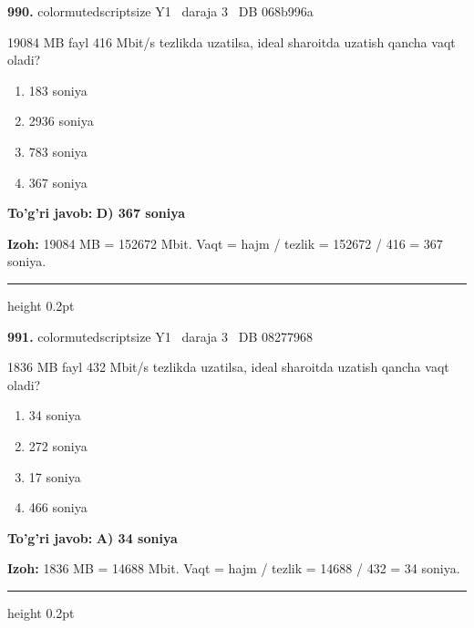 \documentclass[10pt,a4paper,oneside]{article}
\begin{document}
\noindent\textbf{\color{ink}990.}  {color{muted}scriptsize Y1 \textbullet\ daraja 3 \textbullet\ DB 068b996a}
\par
19084 MB fayl 416 Mbit/s tezlikda uzatilsa, ideal sharoitda uzatish qancha vaqt oladi?
\begin{enumerate}[label=\Alph*),leftmargin=9mm]
\item 183 soniya
\item 2936 soniya
\item 783 soniya
\item 367 soniya
\end{enumerate}
\begin{tcolorbox}[enhanced,breakable,colback=teal!4,colframe=teal!50!black,boxrule=0.5pt,arc=1.1mm,left=3mm,right=3mm,top=1.7mm,bottom=1.7mm,before skip=2mm,after skip=2mm]
\textbf{\color{teal}To'g'ri javob:} \textbf{D) 367 soniya}
\par\smallskip
\textbf{Izoh:} 19084 MB = 152672 Mbit. Vaqt = hajm / tezlik = 152672 / 416 = 367 soniya.
\end{tcolorbox}
\vspace{2mm}\hrule height 0.2pt \vspace{3mm}

\noindent\textbf{\color{ink}991.}  {color{muted}scriptsize Y1 \textbullet\ daraja 3 \textbullet\ DB 08277968}
\par
1836 MB fayl 432 Mbit/s tezlikda uzatilsa, ideal sharoitda uzatish qancha vaqt oladi?
\begin{enumerate}[label=\Alph*),leftmargin=9mm]
\item 34 soniya
\item 272 soniya
\item 17 soniya
\item 466 soniya
\end{enumerate}
\begin{tcolorbox}[enhanced,breakable,colback=teal!4,colframe=teal!50!black,boxrule=0.5pt,arc=1.1mm,left=3mm,right=3mm,top=1.7mm,bottom=1.7mm,before skip=2mm,after skip=2mm]
\textbf{\color{teal}To'g'ri javob:} \textbf{A) 34 soniya}
\par\smallskip
\textbf{Izoh:} 1836 MB = 14688 Mbit. Vaqt = hajm / tezlik = 14688 / 432 = 34 soniya.
\end{tcolorbox}
\vspace{2mm}\hrule height 0.2pt \vspace{3mm}
\end{document}
